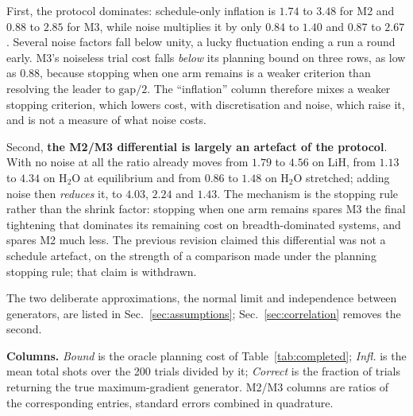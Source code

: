 \documentclass[10pt]{article}
\begin{document}
First, the protocol dominates: schedule-only inflation is $1.74$ to $3.48$ for M2
and $0.88$ to $2.85$ for M3, while noise multiplies it by only $0.84$ to $1.40$
and $0.87$ to $2.67$. Several noise factors fall below unity, a lucky fluctuation
ending a run a round early. M3's noiseless trial cost falls \emph{below} its
planning bound on three rows, as low as $0.88$, because stopping when one arm
remains is a weaker criterion than resolving the leader to $\mathrm{gap}/2$. The
``inflation'' column therefore mixes a weaker stopping criterion, which lowers
cost, with discretisation and noise, which raise it, and is not a measure of what
noise costs.

Second, \textbf{the M2/M3 differential is largely an artefact of the protocol}.
With no noise at all the ratio already moves from $1.79$ to $4.56$ on LiH, from
$1.13$ to $4.34$ on H$_2$O at equilibrium and from $0.86$ to $1.48$ on H$_2$O
stretched; adding noise then \emph{reduces} it, to $4.03$, $2.24$ and $1.43$. The
mechanism is the stopping rule rather than the shrink factor: stopping when one
arm remains spares M3 the final tightening that dominates its remaining cost on
breadth-dominated systems, and spares M2 much less. The previous revision claimed
this differential was not a schedule artefact, on the strength of a comparison
made under the planning stopping rule; that claim is withdrawn.

The two deliberate approximations, the normal limit and independence between
generators, are listed in Sec.~\ref{sec:assumptions};
Sec.~\ref{sec:correlation} removes the second.

\textbf{Columns.} \emph{Bound} is the oracle planning cost of
Table~\ref{tab:completed}; \emph{Infl.} is the mean total shots over the 200
trials divided by it; \emph{Correct} is the fraction of trials returning the true
maximum-gradient generator. M2/M3 columns are ratios of the corresponding
entries, standard errors combined in quadrature.
\end{document}

